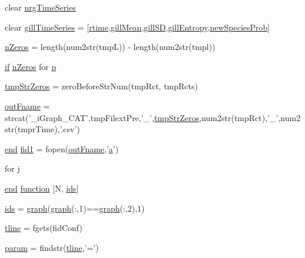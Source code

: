 \begin{DoxyCompactItemize}
\item 
clear \hyperlink{a00028_ad5f4092827ae220bd7c53532aaaa0590}{nrg\+Time\+Series}
\item 
clear \hyperlink{a00028_ad7c5b4f5873064fed5ce2b70ce073f91}{gill\+Time\+Series} = \mbox{[}\hyperlink{a00028_afc6b38657a313b9f1de2ee356910b6ee}{rtime},\hyperlink{a00028_a7d36858faf2f8bb5963306c86db2b549}{gill\+Mean},\hyperlink{a00028_a187931f510c22818692d094c8026ebd1}{gill\+S\+D},\hyperlink{a00028_aef2e92fdea881fe7819bf51b2d7e0783}{gill\+Entropy},\hyperlink{a00028_aa66147edba72bc0b9cf591cd7475396f}{new\+Species\+Prob}\mbox{]}
\item 
\hyperlink{a00028_ac4353d99277795cadf898255e2c73c71}{n\+Zeros} = length(num2str(tmp\+L)) -\/ length(num2str(tmpl))
\item 
\hyperlink{a00030_a01d55766b8058903dd360b4bda71f9f5}{if} \hyperlink{a00028_ac4353d99277795cadf898255e2c73c71}{n\+Zeros} for \hyperlink{a00028_aa2b4c35904308d35fc5d606a429e608d}{p}
\item 
\hyperlink{a00028_aacf946bee61c4c535a7bf6d85f55f66a}{tmp\+Str\+Zeros} = zero\+Before\+Str\+Num(tmp\+Rct, tmp\+Rcts)
\item 
\hyperlink{a00028_abf4ae8c34e865742e8ee979ed6e03384}{out\+Fname} = strcat('\+\_\+i\+Graph\+\_\+\+C\+A\+T',tmp\+Filext\+Pre,'\+\_\+',\hyperlink{a00028_aacf946bee61c4c535a7bf6d85f55f66a}{tmp\+Str\+Zeros},num2str(tmp\+Rct),'\+\_\+',num2str(tmpr\+Time),'.csv')
\item 
\hyperlink{a00025_afb358f48b1646c750fb9da6c6585be2b}{end} \hyperlink{a00028_ae941ef58ebac7f05a8095badde51c07b}{fid1} = fopen(\hyperlink{a00028_abf4ae8c34e865742e8ee979ed6e03384}{out\+Fname},'\hyperlink{a00035_a2ffdbad9ea59541e59cbd2b938e0770c}{a}')
\item 
for \hyperlink{a00028_ad34e9c7e9ae69ae0b9f1866faed5e4ad}{j}
\item 
\hyperlink{a00025_afb358f48b1646c750fb9da6c6585be2b}{end} \hyperlink{a00028_af12e4ac3392d0671e386d46e2424a06a}{function} \mbox{[}N, \hyperlink{a00028_a0a9b879f29cc1e1e03ffc7851f7c19b9}{ids}\mbox{]}
\item 
\hyperlink{a00028_a0a9b879f29cc1e1e03ffc7851f7c19b9}{ids} = \hyperlink{a00028_a2745e24fec2a44d51f4452beb1596bd3}{graph}(\hyperlink{a00028_a2745e24fec2a44d51f4452beb1596bd3}{graph}(\+:,1)==\hyperlink{a00028_a2745e24fec2a44d51f4452beb1596bd3}{graph}(\+:,2),1)
\item 
\hyperlink{a00028_a6791897869706b835f1a5d305739a415}{tline} = fgets(fid\+Conf)
\item 
\hyperlink{a00028_a51f20d6b1b54a2eee3be0e8adc96a0ae}{param} = findstr(\hyperlink{a00033_a6791897869706b835f1a5d305739a415}{tline},'=')
\end{DoxyCompactItemize}


